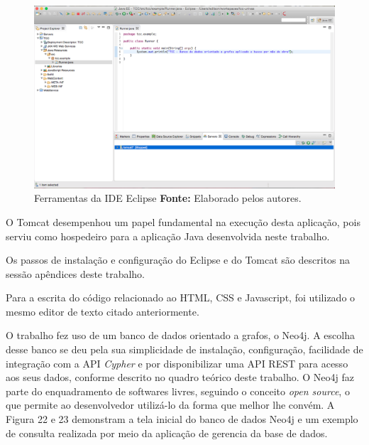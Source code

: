 \newpage
\begin{figure}[h!]
	\centerline{\includegraphics[scale=0.35]{./imagens/eclipse-editor-texto.png}}
	\caption[Ferramentas da IDE Eclipse]
	{Ferramentas da IDE Eclipse \textbf{Fonte:} Elaborado pelos autores.}
	\label{fig:exemplo1}
\end{figure}

\par O Tomcat desempenhou um papel fundamental na execução desta aplicação, pois serviu como hospedeiro para a aplicação Java desenvolvida neste trabalho. 

\par Os passos de instalação e configuração do Eclipse e do Tomcat são descritos na sessão apêndices deste trabalho.

\par Para a escrita do código relacionado ao HTML, CSS e Javascript, foi utilizado o mesmo editor de texto citado anteriormente.

\par O trabalho fez uso de um banco de dados orientado a grafos, o Neo4j. A escolha desse banco se deu pela sua simplicidade de instalação, configuração, facilidade de integração com a API \textit{Cypher} e por disponibilizar uma API REST para acesso aos seus dados, conforme descrito no quadro teórico deste trabalho. O Neo4j faz parte do enquadramento de softwares livres, seguindo o conceito \textit{open source}, o que permite ao desenvolvedor utilizá-lo da forma que melhor lhe convém. A Figura 22 e 23 demonstram a tela inicial do banco de dados Neo4j e um exemplo de consulta realizada por meio da aplicação de gerencia da base de dados.

